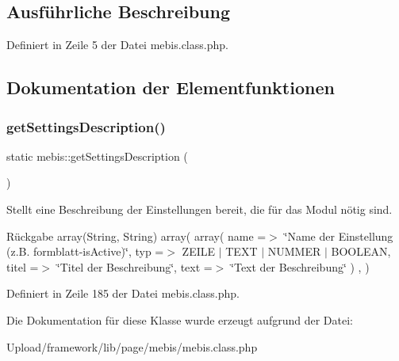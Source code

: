 \subsection{Ausführliche Beschreibung}


Definiert in Zeile 5 der Datei mebis.\+class.\+php.



\subsection{Dokumentation der Elementfunktionen}
\mbox{\label{classmebis_abbeca516ef6c8f23c74fe1f895f1db47}} 
\subsubsection{\texorpdfstring{get\+Settings\+Description()}{getSettingsDescription()}}
{\footnotesize\ttfamily static mebis\+::get\+Settings\+Description (\begin{DoxyParamCaption}{ }\end{DoxyParamCaption})\hspace{0.3cm}{\ttfamily [static]}}

Stellt eine Beschreibung der Einstellungen bereit, die für das Modul nötig sind. \begin{DoxyReturn}{Rückgabe}
array(\+String, String) array( array( \textquotesingle{}name\textquotesingle{} =$>$ \char`\"{}\+Name der Einstellung (z.\+B. formblatt-\/is\+Active)\char`\"{}, \textquotesingle{}typ\textquotesingle{} =$>$ Z\+E\+I\+LE $\vert$ T\+E\+XT $\vert$ N\+U\+M\+M\+ER $\vert$ B\+O\+O\+L\+E\+AN, \textquotesingle{}titel\textquotesingle{} =$>$ \char`\"{}\+Titel der Beschreibung\char`\"{}, \textquotesingle{}text\textquotesingle{} =$>$ \char`\"{}\+Text der Beschreibung\char`\"{} ) , ) 
\end{DoxyReturn}


Definiert in Zeile 185 der Datei mebis.\+class.\+php.



Die Dokumentation für diese Klasse wurde erzeugt aufgrund der Datei\+:\begin{DoxyCompactItemize}
\item 
Upload/framework/lib/page/mebis/mebis.\+class.\+php\end{DoxyCompactItemize}
